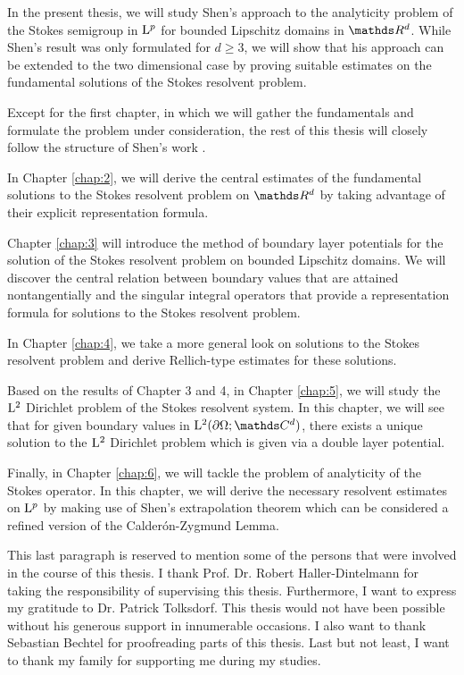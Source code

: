 In the present thesis, we will study Shen's approach to the analyticity problem of the Stokes semigroup in $\mathrm{L}^p$ for bounded Lipschitz domains in $\R^d$.
While Shen's result was only formulated for $d \geq 3$, we will show that his approach can be extended to the two dimensional case by proving suitable estimates on the fundamental solutions of the Stokes resolvent problem.

Except for the first chapter, in which we will gather the fundamentals and formulate the problem under consideration, the rest of this thesis will closely follow the structure of Shen's work \cite{Shen2012}. 

In Chapter \ref{chap:2}, we will derive the central estimates of the fundamental solutions to the Stokes resolvent problem on $\R^d$ by taking advantage of their explicit representation formula.

Chapter \ref{chap:3} will introduce the method of boundary layer potentials for the solution of the Stokes resolvent problem on bounded Lipschitz domains.
We will discover the central relation between boundary values that are attained nontangentially and the singular integral operators that provide a representation formula for solutions to the Stokes resolvent problem. 

In Chapter \ref{chap:4}, we take a more general look on solutions to the Stokes resolvent problem and derive Rellich-type estimates for these solutions.

Based on the results of Chapter 3 and 4, in Chapter \ref{chap:5}, we will study the $\mathrm{L}^2$ Dirichlet problem of the Stokes resolvent system. In this chapter, we will see that for given boundary values in $\Ell^2(\partial\Omega; \C^d)$, there exists a unique solution to the $\mathrm{L}^2$ Dirichlet problem which is given via a double layer potential.

Finally, in Chapter \ref{chap:6}, we will tackle the problem of analyticity of the Stokes operator. In this chapter, we will derive the necessary resolvent estimates on $\mathrm{L}^p$ by making use of Shen's extrapolation theorem which can be considered a refined version of the Calder\'on-Zygmund Lemma.

This last paragraph is reserved to mention some of the persons that were involved in the course of this thesis.
I thank Prof. Dr. Robert Haller-Dintelmann for taking the responsibility of supervising this thesis.
Furthermore, I want to express my gratitude to Dr. Patrick Tolksdorf. 
This thesis would not have been possible without his generous support in innumerable occasions.
I also want to thank Sebastian Bechtel for proofreading parts of this thesis. 
Last but not least, I want to thank my family for supporting me during my studies.

